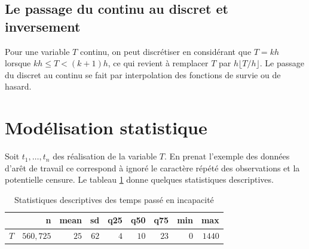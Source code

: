 \subsection{Le passage du continu au discret et inversement}
Pour une variable $T$ continu, on peut discrétiser en considérant que $T=kh$ lorsque $kh\leq T <(k+1)h$, ce qui revient à remplacer $T$ par $h\lfloor T/h\rfloor$. Le passage du discret au continu se fait par interpolation des fonctions de survie ou de hasard.
\section{Modélisation statistique}
Soit $t_1,\ldots, t_n$ des réalisation \iid de la variable $T$. En prenat l'exemple des données d'arêt de travail ce correspond à ignoré le caractère répété des observations et la potentielle censure. Le tableau \cref{tab:stat_desc_T} donne quelques statistiques descriptives.
\begin{table}[ht]
\centering
\begin{tabular}{rrrrrrrrr}
  \hline
 & n & mean & sd & q25 & q50 & q75 & min & max \\ 
  \hline
$T$ & $560,725$ & $25$ & $62 $& $4$ & $10$ & $23$ & $0$ & $1440$ \\ 
   \hline
\end{tabular}
\caption{Statistiques descriptives des temps passé en incapacité}
\label{tab:stat_desc_T}
\end{table}
